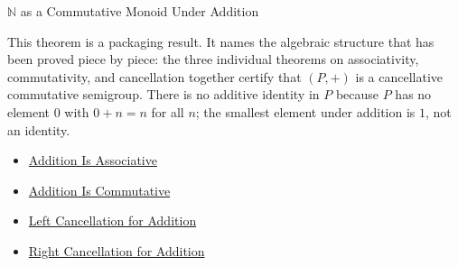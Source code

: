 \begin{topicbox}{$\mathbb{N}$ as a Commutative Monoid Under Addition}
\begin{remark*}[Interpretation]
This theorem is a packaging result. It names the algebraic structure that
has been proved piece by piece: the three individual theorems on associativity,
commutativity, and cancellation together certify that $(P,+)$ is a cancellative
commutative semigroup. There is no additive identity in $P$ because $P$ has
no element $0$ with $0+n=n$ for all $n$; the smallest element under addition
is $1$, not an identity.
\end{remark*}

\begin{dependencies}
\begin{itemize}
  \item \hyperref[thm:addition-associative]{Addition Is Associative}
  \item \hyperref[thm:addition-commutative]{Addition Is Commutative}
  \item \hyperref[thm:addition-left-cancellation]{Left Cancellation for Addition}
  \item \hyperref[thm:addition-right-cancellation]{Right Cancellation for Addition}
\end{itemize}
\end{dependencies}
\end{topicbox}

